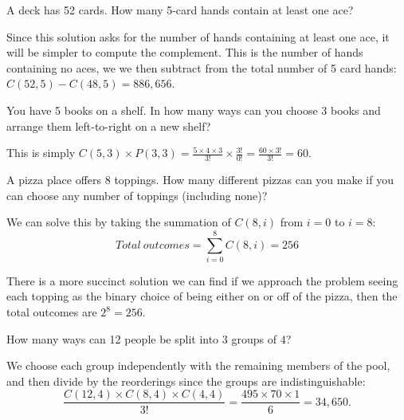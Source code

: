 \medskip

\begin{problem}
A deck has 52 cards. How many 5-card hands contain at least one ace?
\end{problem}

\begin{solution}
Since this solution asks for the number of hands containing at least one ace, it will be simpler to compute the complement. This is the number of hands containing no aces, we we then subtract from the total number of 5 card hands: $C(52, 5) - C(48, 5) = 886,656$.
\end{solution}

\medskip

\begin{problem}
You have 5 books on a shelf. In how many ways can you choose 3 books and arrange them left-to-right on a new shelf?
\end{problem}

\begin{solution}
This is simply $C(5,3) \times P(3, 3) = \frac{5 \times 4 \times 3}{3!} \times \frac{3!}{0!} = \frac{60 \times 3!}{3!} = 60$.
\end{solution}

\medskip

\begin{problem}
A pizza place offers 8 toppings. How many different pizzas can you make if you can choose any number of toppings (including none)?
\end{problem}

\begin{solution}
We can solve this by taking the summation of $C(8, i)$ from $i=0$ to $i=8$:
\[
Total\ outcomes = \sum\limits_{i=0}^{8} C(8,i) = 256
\]

There is a more succinct solution we can find if we approach the problem seeing each topping as the binary choice of being either on or off of the pizza, then the total outcomes are $2^8 = 256$.
\end{solution}

\medskip

\begin{problem}
How many ways can 12 people be split into 3 groups of 4?
\end{problem}

\begin{solution}
We choose each group independently with the remaining members of the pool, and then divide by the reorderings since the groups are indistinguishable:
\[
\frac{C(12, 4) \times C(8, 4) \times C(4, 4)}{3!} = \frac{495 \times 70 \times 1}{6} = 34,650.
\]
\end{solution}
